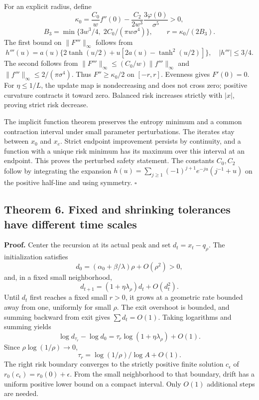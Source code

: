 For an explicit radius, define \[
\kappa_0=\frac{C_0}{w}f''(0)
-\frac{C_2}{2w^3}\frac{3\varphi(0)}{\sigma^5}>0,
\] \[
B_3=\min\{3w^3/4,\;2C_0/(\pi w\sigma^4)\},\qquad r=\kappa_0/(2B_3).
\] The first bound on \(\|F'''\|_\infty\) follows from \[
h'''(u)=a(u)\{2\tanh(u/2)+u[2a(u)-\tanh^2(u/2)]\},
\quad |h'''|\le3/4.
\] The second follows from \(\|F'''\|_\infty\le(C_0/w)\|f'''\|_\infty\)
and \(\|f'''\|_\infty\le2/(\pi\sigma^4)\). Thus \(F''\ge\kappa_0/2\) on
\([-r,r]\). Evenness gives \(F'(0)=0\). For \(\eta\le1/L\), the update
map is nondecreasing and does not cross zero; positive curvature
contracts it toward zero. Balanced risk increases strictly with \(|x|\),
proving strict risk decrease.

The implicit function theorem preserves the entropy minimum and a common
contraction interval under small parameter perturbations. The iterates
stay between \(x_0\) and \(x_e\). Strict endpoint improvement persists
by continuity, and a function with a unique risk minimum has its maximum
over this interval at an endpoint. This proves the perturbed safety
statement. The constants \(C_0,C_2\) follow by integrating the expansion
\(h(u)=\sum_{j\ge1}(-1)^{j+1}e^{-ju}(j^{-1}+u)\) on the positive
half-line and using symmetry. \(\square\)

\subsection{Theorem 6. Fixed and shrinking tolerances have different
time
scales}\label{gaussian_proofs-theorem-6.-fixed-and-shrinking-tolerances-have-different-time-scales}

\textbf{Proof.} Center the recursion at its actual peak and set
\(d_t=x_t-q_\rho\). The initialization satisfies \[
d_0=(\alpha_0+\beta/\lambda)\rho+O(\rho^2)>0,
\] and, in a fixed small neighborhood, \[
d_{t+1}=(1+\eta\lambda_\rho)d_t+O(d_t^2).
\] Until \(d_t\) first reaches a fixed small \(r>0\), it grows at a
geometric rate bounded away from one, uniformly for small \(\rho\). The
exit overshoot is bounded, and summing backward from exit gives
\(\sum d_t=O(1)\). Taking logarithms and summing yields \[
\log d_{\tau_r}-\log d_0
=\tau_r\log(1+\eta\lambda_\rho)+O(1).
\] Since \(\rho\log(1/\rho)\to0\), \[
\tau_r=\log(1/\rho)/\log A+O(1).
\] The right risk boundary converges to the strictly positive finite
solution \(c_\epsilon\) of \(r_0(c_\epsilon)=r_0(0)+\epsilon\). From the
small neighborhood to that boundary, drift has a uniform positive lower
bound on a compact interval. Only \(O(1)\) additional steps are needed.

